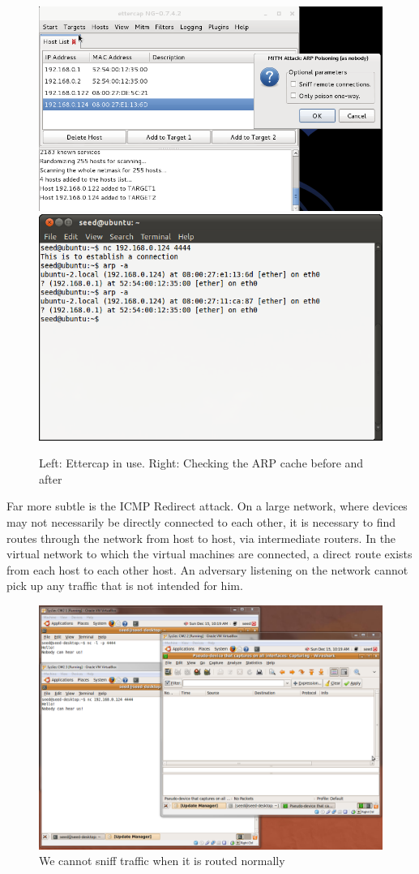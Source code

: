 \begin{figure}[h]
    \centering
    \includegraphics[width=.5\linewidth]{images/ettercap.png} \includegraphics[width=.45\linewidth]{images/arp.png}
    \caption{Left: Ettercap in use. Right: Checking the ARP cache before and after}
    \label{fig:etterarp}
\end{figure}

Far more subtle is the ICMP Redirect attack. On a large network, where devices may not necessarily be directly connected
to each other, it is necessary to find routes through the network from host to host, via intermediate routers. In the
virtual network to which the virtual machines are connected, a direct route exists from each host to each other host. An
adversary listening on the network cannot pick up any traffic that is not intended for him.

\begin{figure}[h]
    \centering
    \includegraphics[width=.7\linewidth]{images/icmp_redirect_before.png}
    \caption{We cannot sniff traffic when it is routed normally} \label{fig:icmp_before}
\end{figure}

